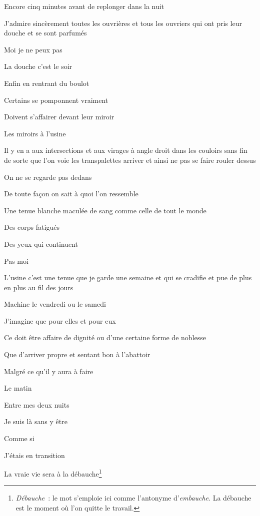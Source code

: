 {Encore cinq minutes avant de replonger dans la nuit

J'admire sincèrement toutes les ouvrières et tous les ouvriers qui ont pris 
leur douche et se sont parfumés

Moi je ne peux pas

La douche c'est le soir

Enfin en rentrant du boulot

Certains se pomponnent vraiment

Doivent s'affairer devant leur miroir

\medskip

Les miroirs à l'usine

Il y en a aux intersections et aux virages à angle droit dans les couloirs 
sans fin de sorte que l'on voie les transpalettes arriver et ainsi ne pas se 
faire rouler dessus

On ne se regarde pas dedans

De toute façon on sait à quoi l'on ressemble

Une tenue blanche maculée de sang comme celle de tout le monde

Des corps fatigués

Des yeux qui continuent

\medskip

Pas moi

L'usine c'est une tenue que je garde une semaine et qui se cradifie et pue de plus en plus au fil des jours

Machine le vendredi ou le samedi

\medskip

J'imagine que pour elles et pour eux

Ce doit être affaire de dignité ou d'une certaine forme de noblesse

Que d'arriver propre et sentant bon à l'abattoir

Malgré ce qu'il y aura à faire

\medskip

Le matin

Entre mes deux nuits

Je suis là sans y être

Comme si

J'étais en transition

La vraie vie sera à la débauche\footnote{\emph{Débauche}~: le mot s'emploie ici comme l'antonyme d'\emph{embauche}. La débauche est le
moment où l'on quitte le travail.
\setlength{\parskip}{6pt}}
}

